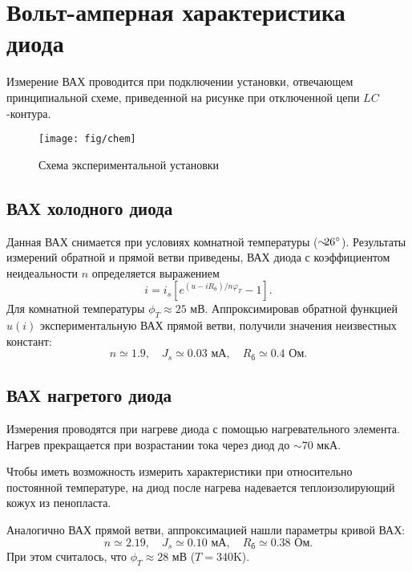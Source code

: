 \documentclass[a4paper,14pt]{extarticle}
\begin{document}
\newpage


\section{Вольт-амперная характеристика диода}
Измерение ВАХ проводится при подключении установки, отвечающем принципиальной схеме, приведенной на рисунке при отключенной цепи $LC$-контура. 

\begin{figure}[h!]
	\centering
	\texttt{[image: fig/chem]}
	\caption{Схема экспериментальной установки}
	\label{fig:chem}
\end{figure}


\subsection{ВАХ холодного диода}
Данная ВАХ снимается при условиях комнатной температуры ($\sim\hspace{-0.5em}26^\circ$). Результаты измерений обратной и прямой ветви приведены, 
ВАХ диода с коэффициентом неидеальности $n$ определяется выражением
\begin{equation}
    i=i_s[e^{(u-iR_{\text{б}})/n \varphi_T}-1].
    \label{eq:id}
\end{equation}
Для комнатной температуры $\phi_T\approx 25$ мВ. Аппроксимировав обратной функцией $u(i)$ экспериментальную ВАХ прямой ветви, получили значения неизвестных констант:
\begin{equation}
    n \simeq 1.9,\quad J_s \simeq 0.03  \text{ мА},\quad R_{\text{б}} \simeq 0.4 \text{ Ом}.
\end{equation}



\subsection{ВАХ нагретого диода}


Измерения проводятся при нагреве диода с помощью нагревательного элемента. Нагрев прекращается при возрастании тока через диод до $\sim70$ мкА. 

Чтобы иметь возможность измерить характеристики при относительно постоянной температуре, на диод после нагрева надевается теплоизолирующий кожух из пенопласта.

Аналогично ВАХ прямой ветви, аппроксимацией нашли параметры кривой ВАХ:
\begin{equation}
    n \simeq 2.19,\quad J_s \simeq 0.10  \text{ мА},\quad R_{\text{б}} \simeq 0.38 \text{ Ом}.
\end{equation}
При этом считалось, что $\phi_T\approx28$ мВ ($T=340$K).
\end{document}
